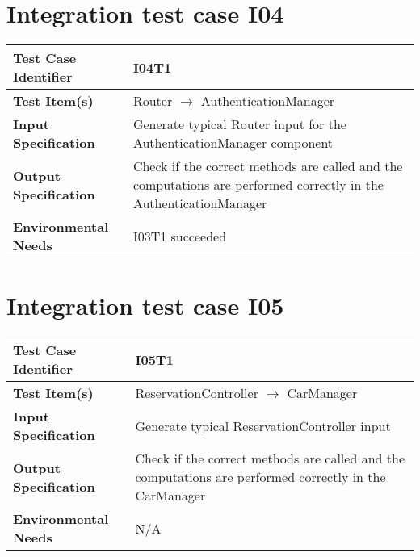 \section{Integration test case I04}\label{I04}
\begin{center}
	\vspace{0.6cm}
	\begin{tabular}{|l|p{10cm}|}
		\hline
		\textbf{Test Case Identifier} & I04T1 \bigstrut \\\hline
		\textbf{Test Item(s)} & Router \ensuremath{\rightarrow} AuthenticationManager \bigstrut \\\hline
		\textbf{Input Specification} & Generate typical Router input for the AuthenticationManager component \bigstrut \\\hline
		\textbf{Output Specification} & Check if the correct methods are called and the computations are performed correctly in the AuthenticationManager \bigstrut \\\hline
		\textbf{Environmental Needs} & I03T1 succeeded \bigstrut \\\hline
	\end{tabular}
\end{center}

\section{Integration test case I05}\label{I05}
\begin{center}
	\vspace{0.6cm}
	\begin{tabular}{|l|p{10cm}|}
		\hline
		\textbf{Test Case Identifier} & I05T1 \bigstrut \\\hline
		\textbf{Test Item(s)} & ReservationController \ensuremath{\rightarrow} CarManager \bigstrut \\\hline
		\textbf{Input Specification} & Generate typical ReservationController input \bigstrut \\\hline
		\textbf{Output Specification} & Check if the correct methods are called and the computations are performed correctly in the CarManager \bigstrut \\\hline
		\textbf{Environmental Needs} & N/A \bigstrut \\\hline
	\end{tabular}
\end{center}

